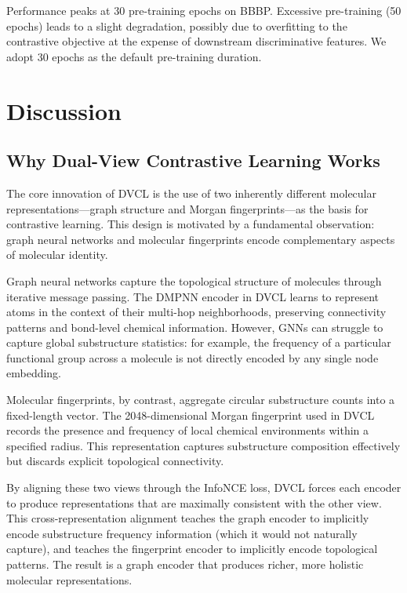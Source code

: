 \documentclass[a4paper,fleqn]{cas-sc}
\begin{document}
Performance peaks at 30 pre-training epochs on BBBP. Excessive pre-training (50 epochs) leads to a slight degradation, possibly due to overfitting to the contrastive objective at the expense of downstream discriminative features. We adopt 30 epochs as the default pre-training duration.


\section{Discussion}\label{sec:discussion}

\subsection{Why Dual-View Contrastive Learning Works}

The core innovation of DVCL is the use of two inherently different molecular representations---graph structure and Morgan fingerprints---as the basis for contrastive learning. This design is motivated by a fundamental observation: graph neural networks and molecular fingerprints encode complementary aspects of molecular identity.

Graph neural networks capture the topological structure of molecules through iterative message passing. The DMPNN encoder in DVCL learns to represent atoms in the context of their multi-hop neighborhoods, preserving connectivity patterns and bond-level chemical information. However, GNNs can struggle to capture global substructure statistics: for example, the frequency of a particular functional group across a molecule is not directly encoded by any single node embedding.

Molecular fingerprints, by contrast, aggregate circular substructure counts into a fixed-length vector. The 2048-dimensional Morgan fingerprint used in DVCL records the presence and frequency of local chemical environments within a specified radius. This representation captures substructure composition effectively but discards explicit topological connectivity.

By aligning these two views through the InfoNCE loss, DVCL forces each encoder to produce representations that are maximally consistent with the other view. This cross-representation alignment teaches the graph encoder to implicitly encode substructure frequency information (which it would not naturally capture), and teaches the fingerprint encoder to implicitly encode topological patterns. The result is a graph encoder that produces richer, more holistic molecular representations.
\end{document}
